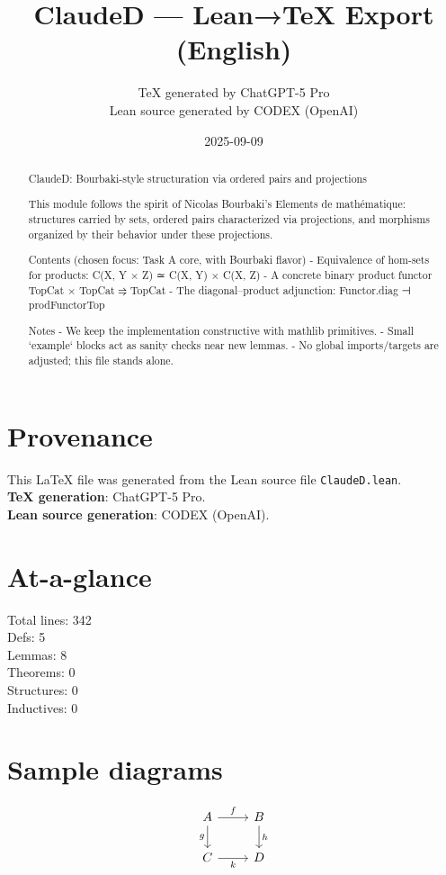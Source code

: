 \documentclass[12pt]{article}
\title{ClaudeD — Lean→TeX Export (English)}
\author{TeX generated by ChatGPT-5 Pro\\Lean source generated by CODEX (OpenAI)}
\date{2025-09-09}
\begin{document}
\maketitle

\begin{abstract}
ClaudeD: Bourbaki-style structuration via ordered pairs and projections

  This module follows the spirit of Nicolas Bourbaki's Elements de mathématique:
  structures carried by sets, ordered pairs characterized via projections, and
  morphisms organized by their behavior under these projections.

  Contents (chosen focus: Task A core, with Bourbaki flavor)
  - Equivalence of hom-sets for products: C(X, Y × Z) ≃ C(X, Y) × C(X, Z)
  - A concrete binary product functor TopCat × TopCat ⥤ TopCat
  - The diagonal–product adjunction: Functor.diag ⊣ prodFunctorTop

  Notes
  - We keep the implementation constructive with mathlib primitives.
  - Small `example` blocks act as sanity checks near new lemmas.
  - No global imports/targets are adjusted; this file stands alone.
\end{abstract}

\section*{Provenance}
This \LaTeX{} file was generated from the Lean source file \texttt{ClaudeD.lean}.\\
\textbf{TeX generation}: ChatGPT-5 Pro.\\
\textbf{Lean source generation}: CODEX (OpenAI).

\section*{At-a-glance}
Total lines: 342\\
Defs: 5\\
Lemmas: 8\\
Theorems: 0\\
Structures: 0\\
Inductives: 0

\section*{Sample diagrams}

\[
\begin{tikzcd}
A \arrow[r, "f"] \arrow[d, "g"'] & B \arrow[d, "h"] \\
C \arrow[r, "k"'] & D
\end{tikzcd}
\]
\end{document}
